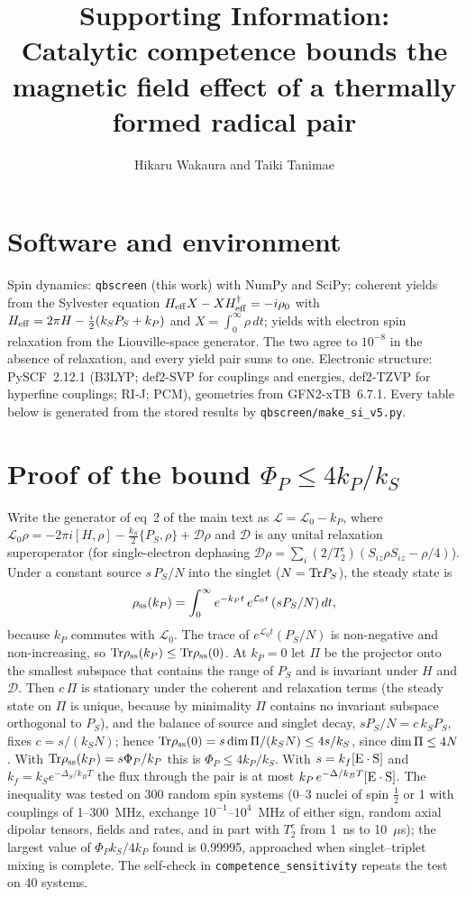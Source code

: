 \documentclass[11pt]{article}
\title{Supporting Information:\\ Catalytic competence bounds the magnetic field
effect of a thermally formed radical pair}
\author{Hikaru Wakaura and Taiki Tanimae}
\date{}
\begin{document}
\maketitle

\section{Software and environment}
Spin dynamics: \texttt{qbscreen} (this work) with NumPy and SciPy; coherent
yields from the Sylvester equation
$H_{\rm eff}X - XH_{\rm eff}^\dagger = -i\rho_0$ with
$H_{\rm eff} = 2\pi H - \tfrac{i}{2}(k_SP_S + k_P)$ and $X = \int_0^\infty\rho\,dt$;
yields with electron spin relaxation from the Liouville-space generator. The two
agree to $10^{-8}$ in the absence of relaxation, and every yield pair sums to
one. Electronic structure: PySCF~2.12.1 (B3LYP; def2-SVP for couplings and
energies, def2-TZVP for hyperfine couplings; RI-J; PCM), geometries from
GFN2-xTB~6.7.1. Every table below is generated from the stored results by
\texttt{qbscreen/make\_si\_v5.py}.

\section{Proof of the bound $\Phi_P\le4k_P/k_S$}
Write the generator of eq~2 of the main text as
$\mathcal L = \mathcal L_0 - k_P$, where $\mathcal L_0\rho = -2\pi i[H,\rho]
-\tfrac{k_S}{2}\{P_S,\rho\} + \mathcal D\rho$ and $\mathcal D$ is any unital
relaxation superoperator (for single-electron dephasing
$\mathcal D\rho = \sum_i (2/T_2^e)(S_{iz}\rho S_{iz}-\rho/4)$). Under a constant
source $s\,P_S/N$ into the singlet ($N = {\rm Tr}P_S$), the steady state is
\begin{equation}
\rho_{\rm ss}(k_P) = \int_0^\infty e^{-k_Pt}\,e^{\mathcal L_0t}\,(sP_S/N)\,dt ,
\end{equation}
because $k_P$ commutes with $\mathcal L_0$. The trace of $e^{\mathcal L_0t}(P_S/N)$
is non-negative and non-increasing, so
${\rm Tr}\rho_{\rm ss}(k_P)\le{\rm Tr}\rho_{\rm ss}(0)$. At $k_P=0$ let $\Pi$
be the projector onto the smallest subspace that contains the range of $P_S$ and
is invariant under $H$ and $\mathcal D$. Then $c\,\Pi$ is stationary under the
coherent and relaxation terms (the steady state on $\Pi$ is unique, because by
minimality $\Pi$ contains no invariant subspace orthogonal to $P_S$), and the
balance of source and singlet decay,
$sP_S/N = c\,k_SP_S$, fixes $c = s/(k_SN)$; hence
${\rm Tr}\rho_{\rm ss}(0) = s\,{\rm dim}\,\Pi/(k_SN)\le 4s/k_S$, since
${\rm dim}\,\Pi\le 4N$. With ${\rm Tr}\rho_{\rm ss}(k_P) = s\Phi_P/k_P$ this is
$\Phi_P\le4k_P/k_S$. With $s = k_f[{\rm E\cdot S}]$ and
$k_f = k_Se^{-\Delta_S/k_BT}$ the flux through the pair is at most
$k_P\,e^{-\Delta/k_BT}[{\rm E\cdot S}]$. The inequality was tested on 300 random spin systems (0--3 nuclei of spin
$\tfrac12$ or 1 with couplings of 1--300~MHz, exchange $10^{-1}$--$10^4$~MHz of
either sign, random axial dipolar tensors, fields and rates, and in part with
$T_2^e$ from 1~ns to 10~$\mu$s); the largest value of $\Phi_Pk_S/4k_P$ found is
0.99995, approached when singlet--triplet mixing is complete. The self-check in
\texttt{competence\_sensitivity} repeats the test on 40 systems.
\end{document}

